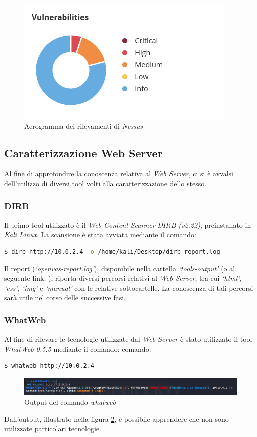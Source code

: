 \begin{figure}[h]
    \centering
    \includegraphics[scale=0.8]{capitoli/images/nessus-chart.png}
    \caption{Aerogramma dei rilevamenti di \emph{Nessus}}
    \label{fig:nessus-chart}
\end{figure}
\subsection{Caratterizzazione Web Server}
Al fine di approfondire la conoscenza relativa al \emph{Web Server}, ci si è avvalsi dell'utilizzo di diversi tool volti alla caratterizzazione dello stesso.
\subsubsection{DIRB}
Il primo tool utilizzato è il \emph{Web Content Scanner} \emph{DIRB (v2.22)}, preinstallato in \emph{Kali Linux}. La scansione è stata avviata mediante il comando:
\begin{lstlisting}[language=bash]
    $ dirb http://10.0.2.4 -o /home/kali/Desktop/dirb-report.log 
\end{lstlisting}
Il report (\emph{`openvas-report.log'}), disponibile nella cartella \emph{`tools-output'} (o al seguente link: ), riporta diversi percorsi relativi al \emph{Web Server}, tra cui \emph{`html', `css', `img'} e \emph{`manual'} con le relative sottocartelle. La conoscenza di tali percorsi sarà utile nel corso delle successive fasi.
\subsubsection{WhatWeb}
Al fine di rilevare le tecnologie utilizzate dal \emph{Web Server} è stato utilizzato il tool \emph{WhatWeb 0.5.5} mediante il comando:
comando:
\begin{lstlisting}[language=bash]
    $ whatweb http://10.0.2.4 
\end{lstlisting}
\begin{figure}[h]
    \centering
    \includegraphics[scale=0.5]{capitoli/images/whatweb.png}
    \caption{Output del comando \emph{whatweb}}
    \label{fig:whatweb}
\end{figure}
Dall'output, illustrato nella figura \ref{fig:whatweb}, è possibile apprendere che non sono utilizzate particolari tecnologie. 
